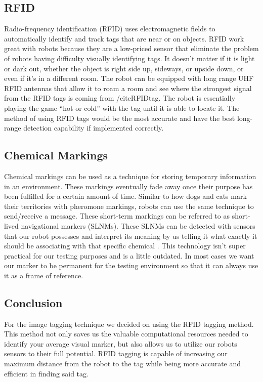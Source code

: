 \documentclass[draftclsnofoot, onecolumn, 10pt, compsoc]{IEEEtran}
\begin{document}
\subsection{RFID}
Radio-frequency identification (RFID) uses electromagnetic fields to automatically identify and track tags that are near or on objects. RFID work great with robots because they are a low-priced sensor that eliminate the problem of robots having difficulty visually identifying tags. It doesn’t matter if it is light or dark out, whether the object is right side up, sideways, or upside down, or even if it’s in a different room. The robot can be equipped with long range UHF RFID antennas that allow it to roam a room and see where the strongest signal from the RFID tags is coming from /cite{RFIDtag}. The robot is essentially playing the game “hot or cold” with the tag until it is able to locate it. The method of using RFID tags would be the most accurate and have the best long-range detection capability if implemented correctly. 
\subsection{Chemical Markings}
Chemical markings can be used as a technique for storing temporary information in an environment. These markings eventually fade away once their purpose has been fulfilled for a certain amount of time. Similar to how dogs and cats mark their territories with pheromone markings, robots can use the same technique to send/receive a message. These short-term markings can be referred to as short-lived navigational markers (SLNMs). These SLNMs can be detected with sensors that our robot possesses and interpret its meaning by us telling it what exactly it should be associating with that specific chemical \cite{ChemicalOdour}. This technology isn’t super practical for our testing purposes and is a little outdated. In most cases we want our marker to be permanent for the testing environment so that it can always use it as a frame of reference.
\subsection{Conclusion}
For the image tagging technique we decided on using the RFID tagging method. This method not only saves us the valuable computational resources needed to identify your average visual marker, but also allows us to utilize our robots sensors to their full potential. RFID tagging is capable of increasing our maximum distance from the robot to the tag while being more accurate and efficient in finding said tag.
\end{document}
